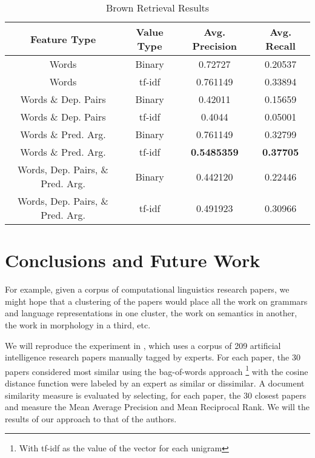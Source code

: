 \documentclass[11pt]{article}
\newcommand{\headcol}{\rowcolor{tableheadcolor}} %
\begin{document}
\begin{table}[H]
\centering
\caption{Brown Retrieval Results}
\label{tbl:BrownRetrievalResults}
\begin{tabular}{|c|c|c|c|}
\hline
\headcol \color{white} Feature Type & \color{white} Value Type & \color{white} Avg. Precision  & \color{white} Avg. Recall \\
\hline
Words & Binary & 0.72727 &   0.20537  \\
Words & tf-idf &  0.761149  & 0.33894\\
Words \& Dep. Pairs & Binary & 0.42011 & 0.15659 \\
Words \& Dep. Pairs & tf-idf & 0.4044 & 0.05001 \\
Words \& Pred. Arg. & Binary & 0.761149  & 0.32799 \\
Words \& Pred. Arg.  & tf-idf &  \textbf{0.5485359} & \textbf{0.37705} \\
Words, Dep. Pairs, \& Pred. Arg. & Binary & 0.442120 & 0.22446 \\
Words, Dep. Pairs, \& Pred. Arg.& tf-idf & 0.491923 & 0.30966 \\
\hline
\end{tabular}
\end{table}



\section{Conclusions and Future Work}






 
\clearpage

For example, given a corpus of computational linguistics research papers, we might hope that a clustering of the papers would place all the work on grammars and language representations in one cluster, the work on semantics in another, the work in morphology in a third, etc. 

We will reproduce the experiment in \cite{Hurtado2013},  which uses a corpus of 209 artificial intelligence research papers manually tagged by experts. For each paper, the 30 papers considered most similar using the bag-of-words approach \footnote{With tf-idf as the value of the vector for each unigram} with  the cosine distance function were labeled by an expert as similar or dissimilar. A document similarity measure is evaluated by selecting, for each paper, the 30 closest papers and measure the Mean Average Precision and Mean Reciprocal Rank. We will the results of our approach to that of the authors. 
\end{document}

